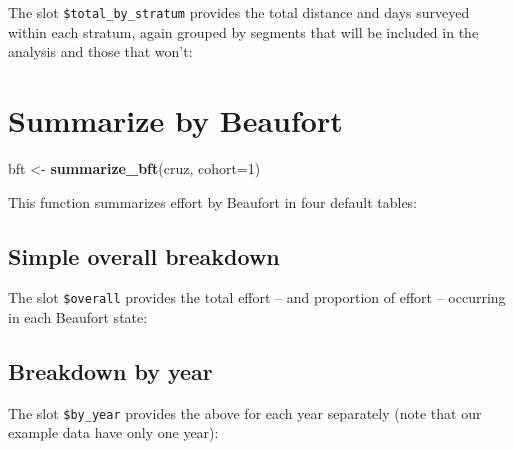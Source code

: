 \documentclass[
]{book}
\newenvironment{Shaded}{\begin{snugshade}}{\end{snugshade}}
\newcommand{\DataTypeTok}[1]{\textcolor[rgb]{0.13,0.29,0.53}{#1}}
\newcommand{\DecValTok}[1]{\textcolor[rgb]{0.00,0.00,0.81}{#1}}
\newcommand{\KeywordTok}[1]{\textcolor[rgb]{0.13,0.29,0.53}{\textbf{#1}}}
\newcommand{\NormalTok}[1]{#1}
\newcommand{\OperatorTok}[1]{\textcolor[rgb]{0.81,0.36,0.00}{\textbf{#1}}}
\newcommand{\StringTok}[1]{\textcolor[rgb]{0.31,0.60,0.02}{#1}}
\begin{document}
The slot \texttt{\$total\_by\_stratum} provides the total distance and days surveyed within each stratum, again grouped by segments that will be included in the analysis and those that won't:

\hypertarget{summarize-by-beaufort}{%
\section*{Summarize by Beaufort}\label{summarize-by-beaufort}}

\begin{Shaded}
\begin{Highlighting}[]
\NormalTok{bft <-}\StringTok{ }\KeywordTok{summarize_bft}\NormalTok{(cruz, }\DataTypeTok{cohort=}\DecValTok{1}\NormalTok{)}
\end{Highlighting}
\end{Shaded}

This function summarizes effort by Beaufort in four default tables:

\begin{Shaded}
\end{Shaded}

\hypertarget{simple-overall-breakdown}{%
\subsection*{Simple overall breakdown}\label{simple-overall-breakdown}}

The slot \texttt{\$overall} provides the total effort -- and proportion of effort -- occurring in each Beaufort state:

\hypertarget{breakdown-by-year}{%
\subsection*{Breakdown by year}\label{breakdown-by-year}}

The slot \texttt{\$by\_year} provides the above for each year separately (note that our example data have only one year):
\end{document}

